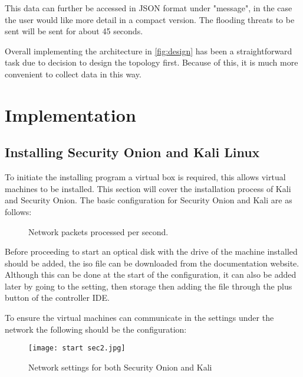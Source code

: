 \documentclass[12pt]{article}
\begin{document}
		This data can further be accessed in JSON format under "message", in the case the user would like more detail in a compact version. The flooding threats to be sent will be sent for about 45 seconds.
		
		Overall implementing the architecture in \ref{fig:design} has been a straightforward task due to decision to design the topology first. Because of this, it is much more convenient to collect data in this way.
		
		\section{Implementation
		}
		\subsection {Installing Security Onion and Kali Linux}
		To initiate the installing program a virtual box is required, this allows virtual machines to be installed. This section will cover the installation process of Kali and Security Onion.
		The basic configuration for Security Onion and Kali are as follows:
		
		\begin{center}
			\begin{figure}[H]
				\centering
				\qquad
				\caption{Network packets processed per second.}%
				\label{fig:install}
			\end{figure}
			
		\end{center}
		Before proceeding to start an optical disk with the drive of the machine installed should be added, the iso file can be downloaded from the documentation website. Although this can be done at the start of the configuration, it can also be added later by going to the setting, then storage then adding the file through the plus button of the controller IDE.
		
		To ensure the virtual machines can communicate in the settings under the network the following should be the configuration:
		
		\begin{center}
			\begin{figure}[H]
				\centering
				\texttt{[image: start sec2.jpg]}
				\caption{Network settings for both Security Onion and Kali  } 
				\label{fig:nat}
			\end{figure}
		\end{center}
		
\end{document}
